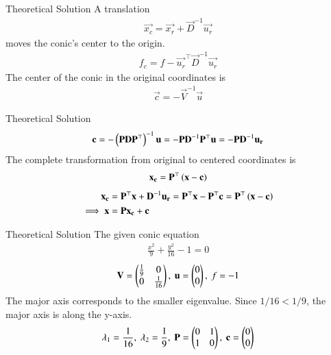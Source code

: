 \documentclass{beamer}
\begin{document}
	\begin{frame}{Theoretical Solution}
		A translation 
		\begin{align}
			\vec{x_c} = \vec{x_r} + \vec{D}^{-1}\vec{u_r}
		\end{align}
		moves the conic's center to the origin.
		\begin{align}
			f_c = f - \vec{u_r}^\top\vec{D}^{-1}\vec{u_r}
		\end{align}
		The center of the conic in the original coordinates is 
		\begin{align}
			\vec{c} = -\vec{V}^{-1}\vec{u}
		\end{align}
	\end{frame}
	
	\begin{frame}{Theoretical Solution}
		\begin{align}
			\mathbf{c} = -\left(\mathbf{P}\mathbf{D}\mathbf{P}^\top\right)^{-1}\mathbf{u} = -\mathbf{P}\mathbf{D}^{-1}\mathbf{P}^\top\mathbf{u} = -\mathbf{P}\mathbf{D}^{-1}\mathbf{u_r}
		\end{align}
		The complete transformation from original to centered coordinates is 
		\begin{align}
			\mathbf{x_c} = \mathbf{P}^\top\left(\mathbf{x}-\mathbf{c}\right)
		\end{align}
		\begin{align}
			\mathbf{x_c} &= \mathbf{P}^\top\mathbf{x} + \mathbf{D}^{-1}\mathbf{u_r} = \mathbf{P}^\top\mathbf{x} - \mathbf{P}^\top\mathbf{c} = \mathbf{P}^\top\left(\mathbf{x}-\mathbf{c}\right) \\
			\implies \mathbf{x} &= \mathbf{P}\mathbf{x_c} + \mathbf{c} \label{eq:71}
		\end{align}
	\end{frame}
	
	\begin{frame}{Theoretical Solution}
		The given conic equation
		\begin{align}
			\frac{x^2}{9} + \frac{y^2}{16} - 1 = 0
		\end{align}
		\begin{align}
			\mathbf{V} = \begin{pmatrix}\frac{1}{9} & 0 \\ 0 & \frac{1}{16}\end{pmatrix}, \text{ } \mathbf{u} = \begin{pmatrix}0 \\ 0\end{pmatrix}, \text{ } f = -1
		\end{align}
		The major axis corresponds to the smaller eigenvalue. Since $1/16 < 1/9$, the major axis is along the y-axis.
		\begin{align}
			\lambda_1 = \frac{1}{16}, \text{ } \lambda_2 = \frac{1}{9}, \text{ } \mathbf{P} = \begin{pmatrix}0 & 1 \\ 1 & 0\end{pmatrix}, \text{ } \mathbf{c} = \begin{pmatrix}0 \\ 0\end{pmatrix}
		\end{align}
	\end{frame}
	
\end{document}

